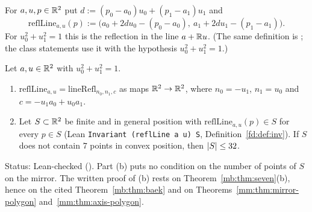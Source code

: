 \begin{definition}\label{mb:def:reflline}
For $a,u,p\in\mathbb R^2$ put $d:=(p_0-a_0)u_0+(p_1-a_1)u_1$ and
\[
\mathrm{reflLine}_{a,u}(p):=\bigl(a_0+2du_0-(p_0-a_0),\ a_1+2du_1-(p_1-a_1)\bigr).
\]
For $u_0^2+u_1^2=1$ this is the reflection in the line $a+\mathbb R u$. (The same definition is
; the class statements use it with the hypothesis $u_0^2+u_1^2=1$.)
\end{definition}

\begin{theorem}\label{mb:thm:refl32}\raggedright
Let $a,u\in\mathbb R^2$ with $u_0^2+u_1^2=1$.
\begin{enumerate}[label=(\alph*)]
\item $\mathrm{reflLine}_{a,u}=\mathrm{lineRefl}_{n_0,n_1,c}$ as maps $\mathbb R^2\to\mathbb R^2$, where $n_0=-u_1$, $n_1=u_0$ and
  $c=-u_1a_0+u_0a_1$.
\item Let $S\subset\mathbb R^2$ be finite and in general position with $\mathrm{reflLine}_{a,u}(p)\in S$ for every $p\in S$
  (Lean \texttt{Invariant (reflLine a u) S}, Definition~\ref{fd:def:inv}). If $S$ does not contain $7$ points in convex
  position, then $\lvert S\rvert\le32$.
\end{enumerate}
\end{theorem}

Status: Lean-checked (). Part (b) puts no condition on the number of points of $S$ on the
mirror. The written proof of (b) rests on Theorem~\ref{mb:thm:seven}(b), hence on the cited Theorem~\ref{mb:thm:baek}
and on Theorems~\ref{mm:thm:mirror-polygon} and~\ref{mm:thm:axis-polygon}.

